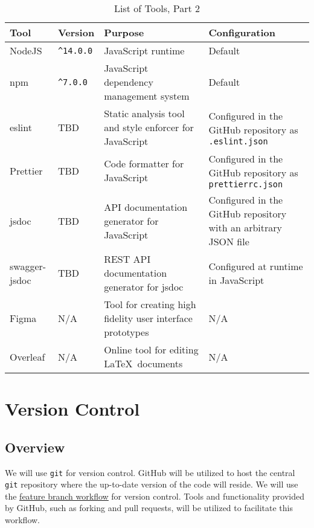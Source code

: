 \documentclass[fullpage]{article}
\begin{document}
\begin{table}[H]
\centering
\begin{tabular}{| l | l | p{3cm} | p{4cm} |}
\hline
 \rowcolor{lightgray} 
\textbf{Tool} & \textbf{Version} & \textbf{Purpose} & \textbf{Configuration} \\
\hline
NodeJS & \verb|^14.0.0| & JavaScript runtime & Default \\
\hline
npm & \verb|^7.0.0| & JavaScript dependency management system & Default \\
\hline
eslint & TBD & Static analysis tool and style enforcer for JavaScript & Configured in the GitHub repository as \verb|.eslint.json| \\
\hline
Prettier & TBD & Code formatter for JavaScript & Configured in the GitHub repository as \verb|prettierrc.json| \\
\hline
jsdoc & TBD & API documentation generator for JavaScript & Configured in the GitHub repository with an arbitrary JSON file \\
\hline
swagger-jsdoc & TBD & REST API documentation generator for jsdoc & Configured at runtime in JavaScript  \\
\hline
Figma & N/A & Tool for creating high fidelity user interface prototypes & N/A \\
\hline
Overleaf & N/A & Online tool for editing \LaTeX~documents & N/A \\
\hline
\end{tabular}
\caption{List of Tools, Part 2}
\end{table}


\section{Version Control}

\subsection{Overview}
We will use \verb|git| for version control. GitHub will be utilized to host the central \verb|git| repository where the up-to-date version of the code will reside. We will use the \href{https://www.atlassian.com/git/tutorials/comparing-workflows/feature-branch-workflow}{\color{blue}\underline{feature branch workflow}} for version control. Tools and functionality provided by GitHub, such as forking and pull requests, will be utilized to facilitate this workflow. 
\end{document}
